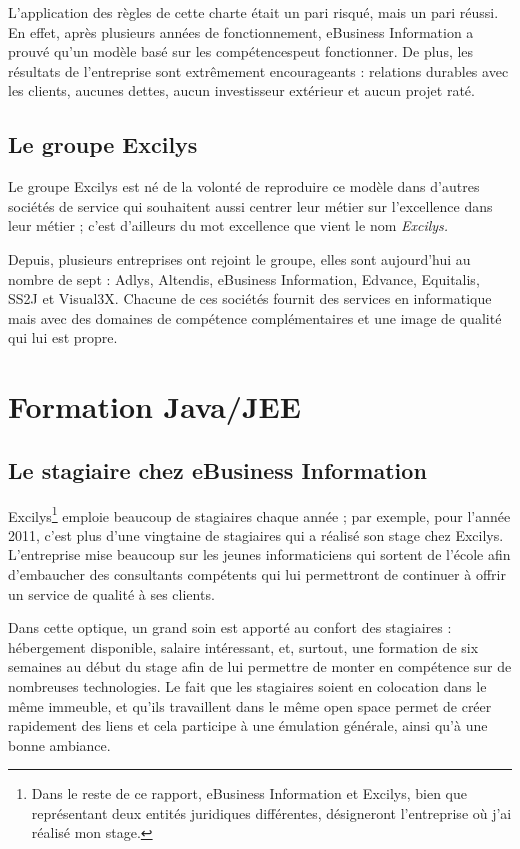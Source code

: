 L'application des règles de cette charte était un pari risqué, mais un pari réussi. En effet, après plusieurs années de fonctionnement, eBusiness Information a prouvé qu'un modèle basé sur les compétencespeut fonctionner. De plus, les résultats de l'entreprise sont extrêmement encourageants : relations durables avec les clients, aucunes dettes, aucun investisseur extérieur et aucun projet raté.

\subsection{Le groupe Excilys}

Le groupe Excilys est né de la volonté de reproduire ce modèle dans d'autres sociétés de service qui souhaitent aussi centrer leur métier sur l'excellence dans leur métier ; c'est d'ailleurs du mot excellence que vient le nom \em{Excilys}.

Depuis, plusieurs entreprises ont rejoint le groupe, elles sont aujourd'hui au nombre de sept : Adlys, Altendis, eBusiness Information, Edvance, Equitalis, SS2J et Visual3X. Chacune de ces sociétés fournit des services en informatique mais avec des domaines de compétence complémentaires et une image de qualité qui lui est propre.
  
\section{Formation Java/JEE}

\subsection{Le stagiaire chez eBusiness Information}

Excilys\footnote{Dans le reste de ce rapport, eBusiness Information et Excilys, bien que représentant deux entités juridiques différentes, désigneront l'entreprise où j'ai réalisé mon stage.} emploie beaucoup de stagiaires chaque année ; par exemple, pour l'année 2011, c'est plus d'une vingtaine de stagiaires qui a réalisé son stage chez Excilys. L'entreprise mise beaucoup sur les jeunes informaticiens qui sortent de l'école afin d'embaucher des consultants compétents qui lui permettront de continuer à offrir un service  de qualité à ses clients.

Dans cette optique, un grand soin est apporté au confort des stagiaires : hébergement disponible, salaire intéressant, et, surtout, une formation de six semaines au début du stage afin de lui permettre de monter en compétence sur de nombreuses technologies. Le fait que les stagiaires soient en colocation dans le même immeuble, et qu'ils travaillent dans le même open space permet de créer rapidement des liens et cela participe à une émulation générale, ainsi qu'à une bonne ambiance.

